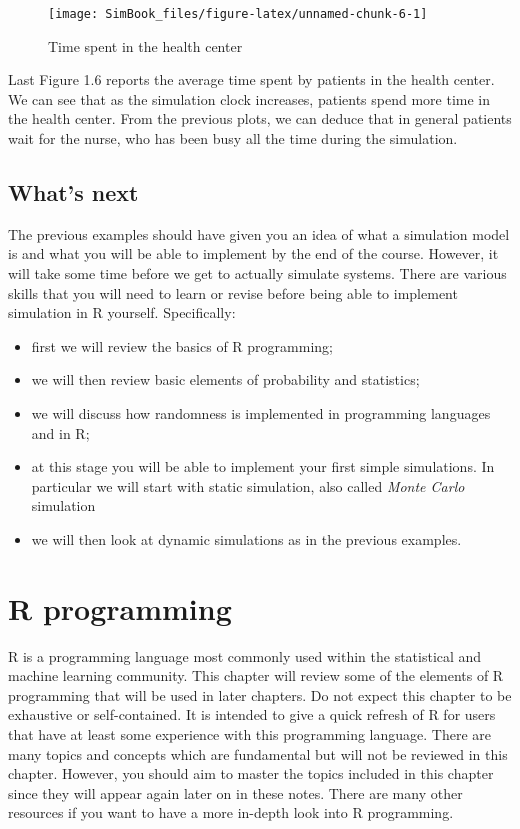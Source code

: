 \documentclass[
]{book}
\begin{document}
\begin{figure}

{\centering \texttt{[image: SimBook\_files/figure-latex/unnamed-chunk-6-1]} 

}

\caption{Time spent in the health center}\label{fig:unnamed-chunk-6}
\end{figure}

Last Figure 1.6 reports the average time spent by patients in the health center. We can see that as the simulation clock increases, patients spend more time in the health center. From the previous plots, we can deduce that in general patients wait for the nurse, who has been busy all the time during the simulation.

\hypertarget{whats-next}{%
\section{What's next}\label{whats-next}}

The previous examples should have given you an idea of what a simulation model is and what you will be able to implement by the end of the course. However, it will take some time before we get to actually simulate systems. There are various skills that you will need to learn or revise before being able to implement simulation in R yourself. Specifically:

\begin{itemize}
\item
  first we will review the basics of R programming;
\item
  we will then review basic elements of probability and statistics;
\item
  we will discuss how randomness is implemented in programming languages and in R;
\item
  at this stage you will be able to implement your first simple simulations. In particular we will start with static simulation, also called \emph{Monte Carlo} simulation
\item
  we will then look at dynamic simulations as in the previous examples.
\end{itemize}

\hypertarget{r-programming}{%
\chapter{R programming}\label{r-programming}}

R is a programming language most commonly used within the statistical and machine learning community. This chapter will review some of the elements of R programming that will be used in later chapters. Do not expect this chapter to be exhaustive or self-contained. It is intended to give a quick refresh of R for users that have at least some experience with this programming language. There are many topics and concepts which are fundamental but will not be reviewed in this chapter. However, you should aim to master the topics included in this chapter since they will appear again later on in these notes. There are many other resources if you want to have a more in-depth look into R programming.
\end{document}
